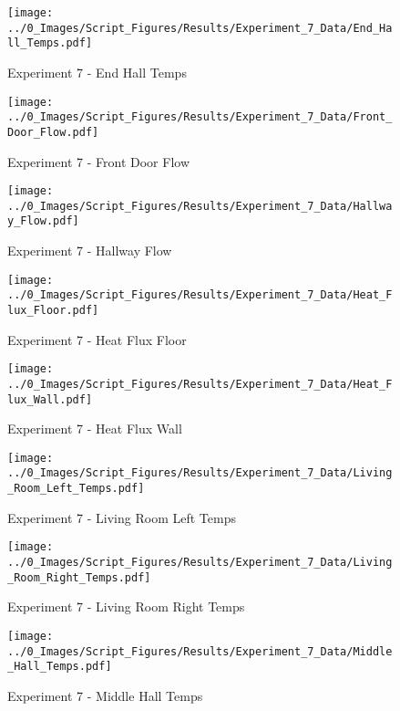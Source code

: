 	\clearpage

	\begin{figure}[H]
		\centering
		\texttt{[image: ../0\_Images/Script\_Figures/Results/Experiment\_7\_Data/End\_Hall\_Temps.pdf]}
		\caption[]{Experiment 7 - End Hall Temps}
	\end{figure}
 

	\begin{figure}[H]
		\centering
		\texttt{[image: ../0\_Images/Script\_Figures/Results/Experiment\_7\_Data/Front\_Door\_Flow.pdf]}
		\caption[]{Experiment 7 - Front Door Flow}
	\end{figure}
 
	\clearpage

	\begin{figure}[H]
		\centering
		\texttt{[image: ../0\_Images/Script\_Figures/Results/Experiment\_7\_Data/Hallway\_Flow.pdf]}
		\caption[]{Experiment 7 - Hallway Flow}
	\end{figure}
 

	\begin{figure}[H]
		\centering
		\texttt{[image: ../0\_Images/Script\_Figures/Results/Experiment\_7\_Data/Heat\_Flux\_Floor.pdf]}
		\caption[]{Experiment 7 - Heat Flux Floor}
	\end{figure}
 
	\clearpage

	\begin{figure}[H]
		\centering
		\texttt{[image: ../0\_Images/Script\_Figures/Results/Experiment\_7\_Data/Heat\_Flux\_Wall.pdf]}
		\caption[]{Experiment 7 - Heat Flux Wall}
	\end{figure}
 

	\begin{figure}[H]
		\centering
		\texttt{[image: ../0\_Images/Script\_Figures/Results/Experiment\_7\_Data/Living\_Room\_Left\_Temps.pdf]}
		\caption[]{Experiment 7 - Living Room Left Temps}
	\end{figure}
 
	\clearpage

	\begin{figure}[H]
		\centering
		\texttt{[image: ../0\_Images/Script\_Figures/Results/Experiment\_7\_Data/Living\_Room\_Right\_Temps.pdf]}
		\caption[]{Experiment 7 - Living Room Right Temps}
	\end{figure}
 

	\begin{figure}[H]
		\centering
		\texttt{[image: ../0\_Images/Script\_Figures/Results/Experiment\_7\_Data/Middle\_Hall\_Temps.pdf]}
		\caption[]{Experiment 7 - Middle Hall Temps}
	\end{figure}
 
